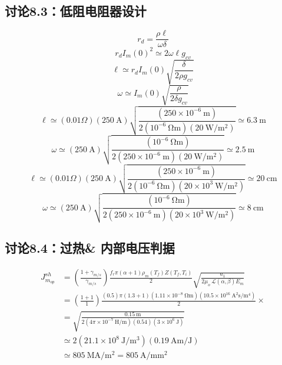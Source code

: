 \subsection{讨论8.3：低阻电阻器设计}
\begin{equation}%
r_d=\frac{\rho\ell}{\omega\delta}
\end{equation}
\begin{equation}%
r_dI_m(0)^2\simeq 2\omega\ell g_{cv}
\end{equation}
\begin{equation}%
\ell\simeq r_dI_m(0)\sqrt{\frac{\delta}{2\rho g_{cv}}}
\end{equation}
\begin{equation}%
\omega\simeq I_m(0)\sqrt{\frac{\rho}{2\delta g_{cv}}}
\end{equation}
\begin{equation}%
\ell\simeq(0.01\Omega)(250\ \mathrm{A})\sqrt{\frac{(250\times 10^{-6}\ \mathrm{m})}{2(10^{-6}\ \mathrm{\Omega m})(20\ \mathrm{W/m^2})}} 
\simeq 6.3\ \mathrm{m}
\end{equation}
\begin{equation}%
\omega\simeq(250\ \mathrm{A})\sqrt{\frac{(10^{-6}\ \mathrm{\Omega m})}{2(250\times 10^{-6}\ \mathrm{m})(20\ \mathrm{W/m^2})}} 
\simeq 2.5\ \mathrm{m}
\end{equation}
\begin{equation}%
\ell\simeq(0.01\Omega)(250\ \mathrm{A})\sqrt{\frac{(250\times 10^{-6}\ \mathrm{m})}{2(10^{-6}\ \mathrm{\Omega m})(20\times 10^3\ \mathrm{W/m^2})}} 
\simeq 20\ \mathrm{cm}
\end{equation}
\begin{equation}%
\omega\simeq(250\ \mathrm{A})\sqrt{\frac{(10^{-6}\ \mathrm{\Omega m})}{2(250\times 10^{-6}\ \mathrm{m})(20\times 10^3\ \mathrm{W/m^2})}} 
\simeq 8\ \mathrm{cm}
\end{equation}


\subsection{讨论8.4：过热\& 内部电压判据}

\begin{align*}%
J_{m_{op}}^{sh}&=\left(\frac{1+\gamma_{m/s}}{\gamma_{m/s}}\right)\frac{f_r\pi(\alpha+1)\rho_m(T_f)Z(T_f,T_i)}{2}\sqrt{\frac{a_1}{2\mu_o\ \mathcal{L}(\alpha,\beta)E_m}} \\
&=\left(\frac{1+1}{1}\right)\frac{(0.5)\pi(1.3+1)(1.11\times 10^{-8}\ \mathrm{\Omega m})(10.5\times 10^{16}\ \mathrm{A^2s/m^4})}{2}\times \\
&=\sqrt{\frac{0.15\ \mathrm{m}}{2(4\pi\times 10^{-7}\ \mathrm{H/m})(0.54)(3\times 10^6\ \mathrm{J})}} \\
&\simeq 2(21.1\times 10^8\ \mathrm{J/m^3})(0.19\ \mathrm{Am/J})\\
&\simeq 805\ \mathrm{MA/m^2}=805\ \mathrm{A/mm^2}
\end{align*}



